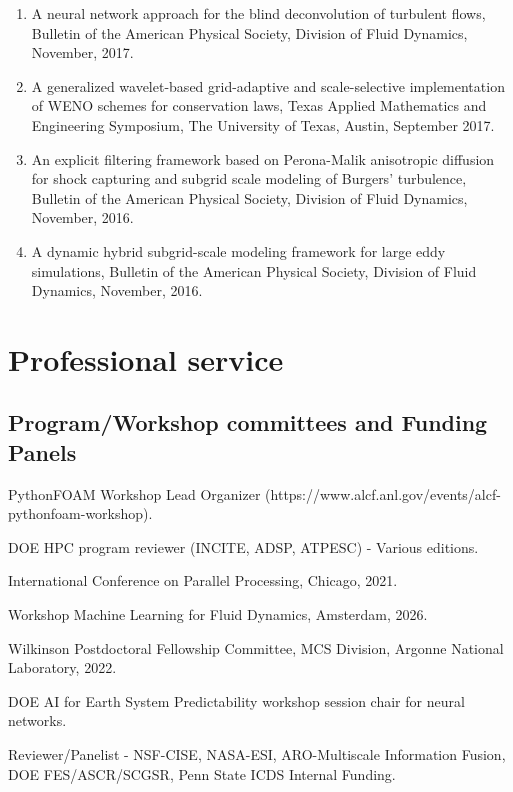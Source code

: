 \documentclass[letterpaper]{article}
\renewenvironment{itemize}{
  \begin{list}{}{
    \setlength{\leftmargin}{1.5em}
  }
}{
  \end{list}
}
\begin{document}
\begin{enumerate}
\item A neural network approach for the blind deconvolution of turbulent flows, Bulletin of the American Physical Society, Division of Fluid Dynamics, November, 2017.

\item A generalized wavelet-based grid-adaptive and scale-selective implementation of WENO schemes for conservation laws, Texas Applied Mathematics and Engineering Symposium, The University of Texas, Austin, September 2017.

\item An explicit filtering framework based on Perona-Malik anisotropic diffusion for shock capturing and subgrid scale modeling of Burgers' turbulence, Bulletin of the American Physical Society, Division of Fluid Dynamics, November, 2016.

\item A dynamic hybrid subgrid-scale modeling framework for large eddy simulations, Bulletin of the American Physical Society, Division of Fluid Dynamics, November, 2016.

\end{enumerate}

\section*{Professional service}

\subsection*{Program/Workshop committees and Funding Panels}

\begin{itemize}
\item PythonFOAM Workshop Lead Organizer (https://www.alcf.anl.gov/events/alcf-pythonfoam-workshop).
\item DOE HPC program reviewer (INCITE, ADSP, ATPESC) - Various editions.
\item International Conference on Parallel Processing, Chicago, 2021.
\item Workshop Machine Learning for Fluid Dynamics, Amsterdam, 2026.
\item Wilkinson Postdoctoral Fellowship Committee, MCS Division, Argonne National Laboratory, 2022.
\item DOE AI for Earth System Predictability workshop session chair for neural networks.
\item Reviewer/Panelist - NSF-CISE, NASA-ESI, ARO-Multiscale Information Fusion, DOE FES/ASCR/SCGSR, Penn State ICDS Internal Funding.
\end{itemize}
\end{document}
